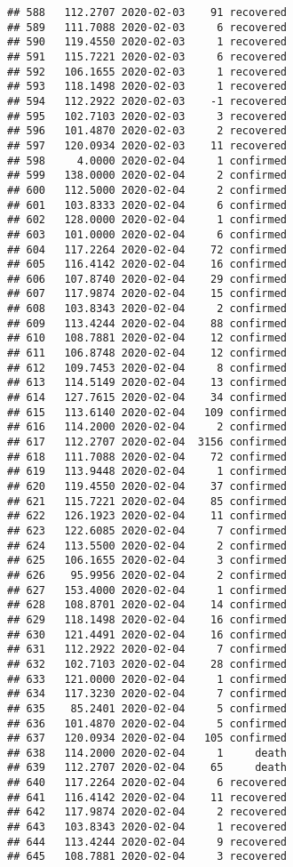 \documentclass[
]{article}
\begin{document}
\begin{verbatim}
## 588   112.2707 2020-02-03    91 recovered
## 589   111.7088 2020-02-03     6 recovered
## 590   119.4550 2020-02-03     1 recovered
## 591   115.7221 2020-02-03     6 recovered
## 592   106.1655 2020-02-03     1 recovered
## 593   118.1498 2020-02-03     1 recovered
## 594   112.2922 2020-02-03    -1 recovered
## 595   102.7103 2020-02-03     3 recovered
## 596   101.4870 2020-02-03     2 recovered
## 597   120.0934 2020-02-03    11 recovered
## 598     4.0000 2020-02-04     1 confirmed
## 599   138.0000 2020-02-04     2 confirmed
## 600   112.5000 2020-02-04     2 confirmed
## 601   103.8333 2020-02-04     6 confirmed
## 602   128.0000 2020-02-04     1 confirmed
## 603   101.0000 2020-02-04     6 confirmed
## 604   117.2264 2020-02-04    72 confirmed
## 605   116.4142 2020-02-04    16 confirmed
## 606   107.8740 2020-02-04    29 confirmed
## 607   117.9874 2020-02-04    15 confirmed
## 608   103.8343 2020-02-04     2 confirmed
## 609   113.4244 2020-02-04    88 confirmed
## 610   108.7881 2020-02-04    12 confirmed
## 611   106.8748 2020-02-04    12 confirmed
## 612   109.7453 2020-02-04     8 confirmed
## 613   114.5149 2020-02-04    13 confirmed
## 614   127.7615 2020-02-04    34 confirmed
## 615   113.6140 2020-02-04   109 confirmed
## 616   114.2000 2020-02-04     2 confirmed
## 617   112.2707 2020-02-04  3156 confirmed
## 618   111.7088 2020-02-04    72 confirmed
## 619   113.9448 2020-02-04     1 confirmed
## 620   119.4550 2020-02-04    37 confirmed
## 621   115.7221 2020-02-04    85 confirmed
## 622   126.1923 2020-02-04    11 confirmed
## 623   122.6085 2020-02-04     7 confirmed
## 624   113.5500 2020-02-04     2 confirmed
## 625   106.1655 2020-02-04     3 confirmed
## 626    95.9956 2020-02-04     2 confirmed
## 627   153.4000 2020-02-04     1 confirmed
## 628   108.8701 2020-02-04    14 confirmed
## 629   118.1498 2020-02-04    16 confirmed
## 630   121.4491 2020-02-04    16 confirmed
## 631   112.2922 2020-02-04     7 confirmed
## 632   102.7103 2020-02-04    28 confirmed
## 633   121.0000 2020-02-04     1 confirmed
## 634   117.3230 2020-02-04     7 confirmed
## 635    85.2401 2020-02-04     5 confirmed
## 636   101.4870 2020-02-04     5 confirmed
## 637   120.0934 2020-02-04   105 confirmed
## 638   114.2000 2020-02-04     1     death
## 639   112.2707 2020-02-04    65     death
## 640   117.2264 2020-02-04     6 recovered
## 641   116.4142 2020-02-04    11 recovered
## 642   117.9874 2020-02-04     2 recovered
## 643   103.8343 2020-02-04     1 recovered
## 644   113.4244 2020-02-04     9 recovered
## 645   108.7881 2020-02-04     3 recovered

\end{verbatim}
\end{document}
